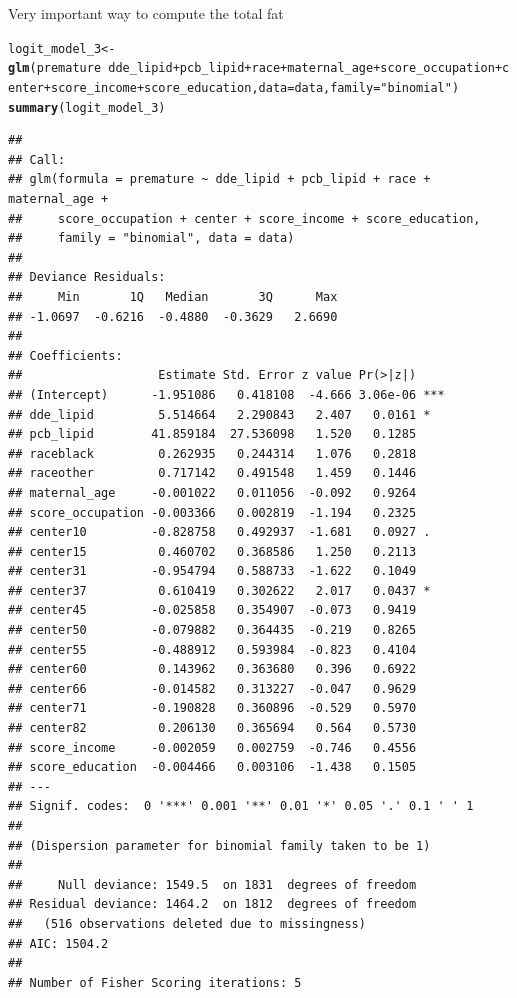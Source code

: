\documentclass{article}\usepackage[]{graphicx}\usepackage[]{color}
\makeatletter
\newcommand{\hlstr}[1]{\textcolor[rgb]{0.192,0.494,0.8}{#1}}%
\newcommand{\hlopt}[1]{\textcolor[rgb]{0,0,0}{#1}}%
\newcommand{\hlstd}[1]{\textcolor[rgb]{0.345,0.345,0.345}{#1}}%
\newcommand{\hlkwb}[1]{\textcolor[rgb]{0.69,0.353,0.396}{#1}}%
\newcommand{\hlkwc}[1]{\textcolor[rgb]{0.333,0.667,0.333}{#1}}%
\newcommand{\hlkwd}[1]{\textcolor[rgb]{0.737,0.353,0.396}{\textbf{#1}}}%
\newenvironment{kframe}{%
 \def\at@end@of@kframe{}%
 \ifinner\ifhmode%
  \def\at@end@of@kframe{\end{minipage}}%
  \begin{minipage}{\columnwidth}%
 \fi\fi%
 \def\FrameCommand##1{\hskip\@totalleftmargin \hskip-\fboxsep
 \colorbox{shadecolor}{##1}\hskip-\fboxsep
     \hskip-\linewidth \hskip-\@totalleftmargin \hskip\columnwidth}%
 \MakeFramed {\advance\hsize-\width
   \@totalleftmargin\z@ \linewidth\hsize
   \@setminipage}}%
 {\par\unskip\endMakeFramed%
 \at@end@of@kframe}
\newenvironment{knitrout}{}{} %
\makeatother
\begin{document}
Very important way to compute the total fat

\begin{knitrout}
\color{fgcolor}\begin{kframe}
\begin{alltt}
\hlstd{logit_model_3} \hlkwb{<-} \hlkwd{glm}\hlstd{(premature} \hlopt{~} \hlstd{dde_lipid} \hlopt{+} \hlstd{pcb_lipid} \hlopt{+} \hlstd{race} \hlopt{+} \hlstd{maternal_age} \hlopt{+} \hlstd{score_occupation} \hlopt{+} \hlstd{center} \hlopt{+} \hlstd{score_income} \hlopt{+} \hlstd{score_education,} \hlkwc{data} \hlstd{= data,} \hlkwc{family} \hlstd{=} \hlstr{"binomial"}\hlstd{)}
\hlkwd{summary}\hlstd{(logit_model_3)}
\end{alltt}
\begin{verbatim}
## 
## Call:
## glm(formula = premature ~ dde_lipid + pcb_lipid + race + maternal_age + 
##     score_occupation + center + score_income + score_education, 
##     family = "binomial", data = data)
## 
## Deviance Residuals: 
##     Min       1Q   Median       3Q      Max  
## -1.0697  -0.6216  -0.4880  -0.3629   2.6690  
## 
## Coefficients:
##                   Estimate Std. Error z value Pr(>|z|)    
## (Intercept)      -1.951086   0.418108  -4.666 3.06e-06 ***
## dde_lipid         5.514664   2.290843   2.407   0.0161 *  
## pcb_lipid        41.859184  27.536098   1.520   0.1285    
## raceblack         0.262935   0.244314   1.076   0.2818    
## raceother         0.717142   0.491548   1.459   0.1446    
## maternal_age     -0.001022   0.011056  -0.092   0.9264    
## score_occupation -0.003366   0.002819  -1.194   0.2325    
## center10         -0.828758   0.492937  -1.681   0.0927 .  
## center15          0.460702   0.368586   1.250   0.2113    
## center31         -0.954794   0.588733  -1.622   0.1049    
## center37          0.610419   0.302622   2.017   0.0437 *  
## center45         -0.025858   0.354907  -0.073   0.9419    
## center50         -0.079882   0.364435  -0.219   0.8265    
## center55         -0.488912   0.593984  -0.823   0.4104    
## center60          0.143962   0.363680   0.396   0.6922    
## center66         -0.014582   0.313227  -0.047   0.9629    
## center71         -0.190828   0.360896  -0.529   0.5970    
## center82          0.206130   0.365694   0.564   0.5730    
## score_income     -0.002059   0.002759  -0.746   0.4556    
## score_education  -0.004466   0.003106  -1.438   0.1505    
## ---
## Signif. codes:  0 '***' 0.001 '**' 0.01 '*' 0.05 '.' 0.1 ' ' 1
## 
## (Dispersion parameter for binomial family taken to be 1)
## 
##     Null deviance: 1549.5  on 1831  degrees of freedom
## Residual deviance: 1464.2  on 1812  degrees of freedom
##   (516 observations deleted due to missingness)
## AIC: 1504.2
## 
## Number of Fisher Scoring iterations: 5
\end{verbatim}
\end{kframe}
\end{knitrout}

\section{}
\end{document}
